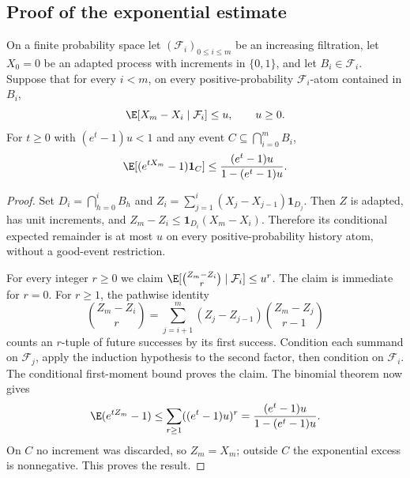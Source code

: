 \subsection{Proof of the exponential estimate}
\begin{lemma}\label{lem:upper-adapted}
On a finite probability space let $(\mathcal F_i)_{0\le i\le m}$
be an increasing filtration, let $X_0=0$ be an adapted process with
increments in $\{0,1\}$, and let $B_i\in\mathcal F_i$.
Suppose that for every $i<m$, on every positive-probability
$\mathcal F_i$-atom contained in $B_i$,
\[
 \E[X_m-X_i\mid\mathcal F_i]\le u,
 \qquad u\ge0.
\]
For $t\ge0$ with $(e^t-1)u<1$ and any event
$C\subseteq\bigcap_{i=0}^m B_i$,
\begin{equation}\label{eq:upper-adapted}
 \E[(e^{tX_m}-1)\mathbf1_C]
                  \le\frac{(e^t-1)u}{1-(e^t-1)u}.
\end{equation}
\end{lemma}
\begin{proof}
Set $D_i=\bigcap_{h=0}^iB_h$ and
$Z_i=\sum_{j=1}^i(X_j-X_{j-1})\mathbf1_{D_j}$.
Then $Z$ is adapted, has unit increments, and
$Z_m-Z_i\le\mathbf1_{D_i}(X_m-X_i)$. Therefore its conditional
expected remainder is at most $u$ on every positive-probability
history atom, without a good-event restriction.

For every integer $r\ge0$ we claim
$\E[\binom{Z_m-Z_i}{r}\mid\mathcal F_i]\le u^r$.
The claim is immediate for $r=0$. For $r\ge1$, the pathwise identity
\[
 \binom{Z_m-Z_i}{r}=
 \sum_{j=i+1}^m(Z_j-Z_{j-1})\binom{Z_m-Z_j}{r-1}
\]
counts an $r$-tuple of future successes by its first success.
Condition each summand on $\mathcal F_j$, apply the induction
hypothesis to the second factor, then condition on $\mathcal F_i$.
The conditional first-moment bound proves the claim.
The binomial theorem now gives
\[
 \E(e^{tZ_m}-1)
 \le\sum_{r\ge1}((e^t-1)u)^r
       =\frac{(e^t-1)u}{1-(e^t-1)u}.
\]
On $C$ no increment was discarded, so $Z_m=X_m$; outside $C$
the exponential excess is nonnegative. This proves the result.
\end{proof}

